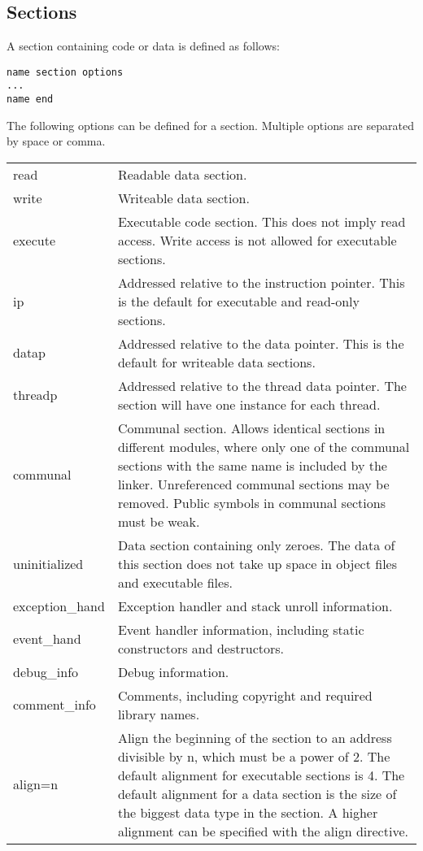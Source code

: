 \documentclass[forwardcom.tex]{subfiles}
\begin{document}
\subsection{Sections} \label{assemblySections}
A section containing code or data is defined as follows:
\begin{lstlisting}[frame=single]
name section options
...
name end
\end{lstlisting}
\vspace{2mm}

The following options can be defined for a section. Multiple options are separated by space or comma.

\begin{tabular}{|p{22mm}p{150mm}|}
\hline
read & Readable data section. \\
write & Writeable data section. \\
execute & Executable code section. This does not imply read access. Write access is not allowed for executable sections. \\
ip & Addressed relative to the instruction pointer. This is the default for executable and read-only sections. \\
datap & Addressed relative to the data pointer. This is the default for writeable data sections. \\
threadp & Addressed relative to the thread data pointer. The section will have one instance for each thread. \\
\label{communal}
communal & Communal section. Allows identical sections in different modules, where only one of the
communal sections with the same name is included by the linker. 
Unreferenced communal sections may be removed.
Public symbols in communal sections must be weak. \\
uninitialized & Data section containing only zeroes. The data of this section does not take up space in object files and executable files.\\
exception\_hand & Exception handler and stack unroll information.\\
event\_hand & Event handler information, including static constructors and destructors.\\
debug\_info & Debug information.\\
comment\_info & Comments, including copyright and required library names.\\
align=n & Align the beginning of the section to an address divisible by n, which must be a power of 2.
The default alignment for executable sections is 4. The default alignment for a data section is the size of the biggest data type in the section. A higher alignment can be specified with the align directive.\\
\hline
\end{tabular}
\vspace{2mm}
\end{document}
